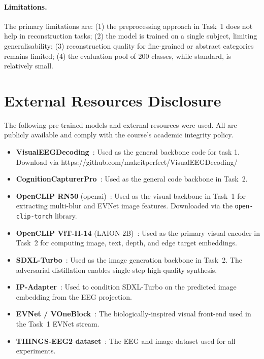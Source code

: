 \documentclass[11pt]{article}
\begin{document}
\paragraph{Limitations.}
The primary limitations are: (1) the preprocessing approach in Task~1 does not help in reconstruction tasks; (2) the model is trained on a single subject, limiting generalisability; (3) reconstruction quality for fine-grained or abstract categories remains limited; (4) the evaluation pool of 200 classes, while standard, is relatively small.

\section{External Resources Disclosure}

The following pre-trained models and external resources were used.
All are publicly available and comply with the course's academic integrity policy.

\begin{itemize}[leftmargin=*, topsep=2pt, itemsep=2pt]
  \item \textbf{VisualEEGDecoding}~\citep{ved2026}: Used as the general backbone code for task 1. Download via https://github.com/makeitperfect/VisualEEGDecoding/
  \item \textbf{CognitionCapturerPro}~\citep{ccp2026}: Used as the general code backbone in Task~2.
  \item \textbf{OpenCLIP RN50} (openai)~\citep{radford2021clip,cherti2023openclip}: Used as the visual backbone in Task~1 for extracting multi-blur and EVNet image features. Downloaded via the \texttt{open-clip-torch} library.
  \item \textbf{OpenCLIP ViT-H-14} (LAION-2B)~\citep{radford2021clip,schuhmann2022laion,cherti2023openclip}: Used as the primary visual encoder in Task~2 for computing image, text, depth, and edge target embeddings.
  \item \textbf{SDXL-Turbo}~\citep{sauer2023sdxlturbo}: Used as the image generation backbone in Task~2. The adversarial distillation enables single-step high-quality synthesis.
  \item \textbf{IP-Adapter}~\citep{ye2023ipadapter}: Used to condition SDXL-Turbo on the predicted image embedding from the EEG projection.
  \item \textbf{EVNet / VOneBlock}~\citep{vone2020,evnet2025}: The biologically-inspired visual front-end used in the Task~1 EVNet stream.
  \item \textbf{THINGS-EEG2 dataset}~\citep{gifford2022thingseeg2data}: The EEG and image dataset used for all experiments.
\end{itemize}
\end{document}
